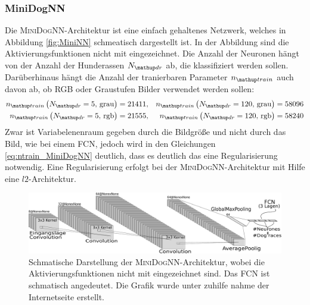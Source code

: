  \subsubsection{MiniDogNN}
 Die \textsc{MiniDogNN}-Architektur ist eine einfach gehaltenes Netzwerk, welches
 in Abbildung \ref{fig:MiniNN} schmeatisch dargestellt ist. In der Abbildung sind
 die Aktivierungsfunktionen nicht mit eingezeichnet. Die Anzahl der Neuronen
 hängt von der Anzahl der Hunderassen $N\ua{dr}$ ab, die klassifiziert werden sollen.
 Darüberhinaus hängt die Anzahl der tranierbaren Parameter $n\ua{train}$ auch davon ab, ob \textsc{RGB} oder
 Graustufen Bilder verwendet werden sollen:
 \begin{align}
   \begin{aligned}
     \label{eq: ntrain_MiniDogNN}
   n\ua{train}\left(N\ua{dr}=5, \, \mathrm{grau}\right) &= 21411, & n\ua{train}\left(N\ua{dr}=120, \, \mathrm{grau}\right) & = 58096 \\
   n\ua{train}\left(N\ua{dr}=5, \, \mathrm{rgb}\right) &= 21555, & n\ua{train}\left(N\ua{dr}=120, \, \mathrm{rgb}\right) & = 58240
   \end{aligned}
 \end{align}
 Zwar ist Variabelenenraum gegeben durch die Bildgröße und nicht durch das Bild, wie
 bei einem FCN, jedoch wird in den Gleichungen \eqref{eq:ntrain_MiniDogNN} deutlich,
 dass es deutlich das eine Regularisierung notwendig. Eine Regularisierung
 erfolgt bei der \textsc{MiniDogNN}-Architektur mit Hilfe eine $l2$-Architektur.
 \begin{figure}
 \centering
 \includegraphics[width=\the\textwidth]{../../final_data/general/MiniDogNN.pdf}
 \caption{Schmatische Darstellung der \textsc{MiniDogNN}-Architektur, wobei
          die Aktivierungsfunktionen nicht mit eingezeichnet sind. Das FCN
          ist schmatisch angedeutet.
          Die Grafik wurde unter zuhilfe nahme der Internetseite \cite{net_svg_source} erstellt.}
 \label{fig:MiniDogNN}
 \end{figure}


